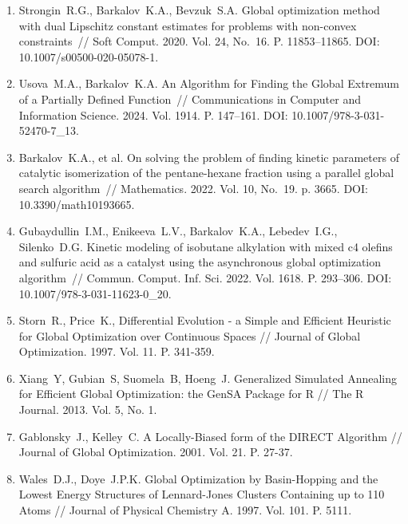 \documentclass[a4paper,12pt,russian]{article}
\begin{document}
\begin{enumerate}
\item \label{rfa:rulit:Strongin2020}
Strongin~R.G., Barkalov~K.A., Bevzuk~S.A. Global optimization method with dual Lipschitz constant estimates for problems with non-convex constraints~// 
Soft Comput. 2020. Vol. 24, No.~16. P. 11853--11865. DOI: 10.1007/s00500-020-05078-1.

\item \label{rfa:rulit:Usova2024}
Usova~M.A., Barkalov~K.A. An Algorithm for Finding the Global Extremum of a Partially Defined Function~// Communications in Computer and Information Science. 2024. Vol. 1914. P. 147--161. DOI: 10.1007/978-3-031-52470-7{\_}13.

\item \label{rfa:rulit:Barkalov2022}
Barkalov~K.A., et al. On solving the problem of finding kinetic parameters of catalytic isomerization of the pentane-hexane fraction using a parallel global search algorithm~// 
Mathematics. 2022. Vol. 10, No.~19. p. 3665. DOI: 10.3390/math10193665.

\item \label{rfa:rulit:Gubaydullin2022}
Gubaydullin~I.M., Enikeeva~L.V., Barkalov~K.A., Lebedev~I.G., Silenko~D.G. Kinetic modeling of isobutane alkylation with mixed c4 olefins and sulfuric acid as a catalyst using the asynchronous global optimization algorithm~// Commun. Comput. Inf. Sci. 2022. Vol. 1618. P. 293--306. DOI: 10.1007/978-3-031-11623-0{\_}20.

\item \label{rfa:rulit:differential_evolution}
Storn~R., Price~K., Differential Evolution - a Simple and Efficient Heuristic for Global Optimization over Continuous Spaces // Journal of Global Optimization. 1997. Vol. 11. P. 341-359.

\item \label{rfa:rulit:dual_annealing}
Xiang~Y, Gubian~S, Suomela~B, Hoeng~J. Generalized Simulated Annealing for Efficient Global Optimization: the GenSA Package for R // The R Journal. 2013. Vol. 5, No. 1.

\item \label{rfa:rulit:direct}
Gablonsky~J., Kelley~C. A Locally-Biased form of the DIRECT Algorithm // Journal of Global Optimization. 2001. Vol. 21. P. 27-37.

\item \label{rfa:rulit:basinhopping}
Wales~D.J., Doye~J.P.K. Global Optimization by Basin-Hopping and the Lowest Energy Structures of Lennard-Jones Clusters Containing up to 110 Atoms // Journal of Physical Chemistry A. 1997. Vol. 101. P. 5111.


\end{enumerate}
\end{document}
